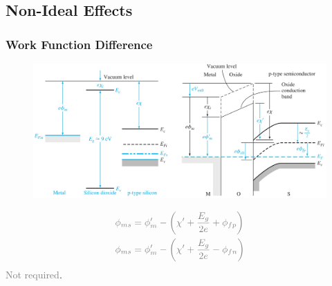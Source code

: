 \documentclass{beamer}
\begin{document}
\subsection{Non-Ideal Effects}
    \begin{frame} \frametitle{Work Function Difference}
        \begin{figure}[H]
            \centering
            \includegraphics[width=0.9\linewidth]{Work-function-difference.jpg}
            \label{fig:Work-function-difference.jpg}
        \end{figure}
        \begin{equation*}
            \textcolor{gray}{ 
                \begin{aligned}
                    \phi_{ms} &= \phi_m^{\prime} - \left( \chi^\prime + \frac{E_g}{2e} + \phi_{fp}  \right) \\
                    \phi_{ms} &= \phi^\prime_m - \left( \chi^\prime + \frac{E_g}{2e} - \phi_{fn}  \right)
                \end{aligned}
            }
        \end{equation*}
        \textcolor{gray}{Not required}. 
    \end{frame}
\end{document}
